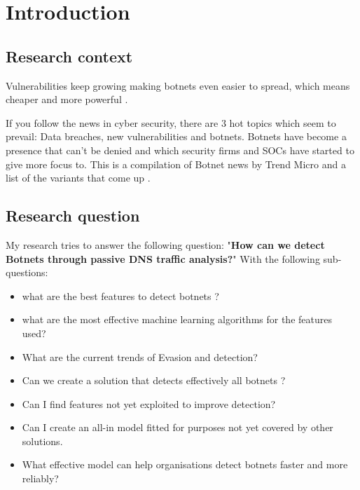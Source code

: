 
\chapter{Introduction} %

\label{Introduction} %


\newcommand{\keyword}[1]{\textbf{#1}}
\newcommand{\tabhead}[1]{\textbf{#1}}
\newcommand{\code}[1]{\texttt{#1}}
\newcommand{\file}[1]{\texttt{\bfseries#1}}
\newcommand{\option}[1]{\texttt{\itshape#1}}

\section{Research context}
Vulnerabilities keep growing making botnets even easier to spread, which means cheaper and more powerful \cite{article1}.

If you follow the news in cyber security, there are 3 hot topics which seem to prevail: Data breaches, new vulnerabilities and botnets. Botnets have become a presence that can't be denied and which security firms and SOCs have started to give more focus to. 
This is a compilation of Botnet news by Trend Micro\cite{trends3} and a list of the variants that come up  \cite{variants}.
\section{Research question}
My research tries to answer the following question: "\textbf{How can we detect Botnets through passive DNS traffic analysis?}"
With the following sub-questions:
\begin{itemize}
\item what are the best features to detect botnets ?
\item what are the most effective machine learning algorithms for the features used?
\item What are the current trends of Evasion and detection?
\item Can we create a solution that detects effectively all botnets ?
\item Can I find features not yet exploited to improve detection?
\item Can I create an all-in model fitted for purposes not yet covered by other solutions.
\item What effective model can help organisations detect botnets faster and more reliably?
\end{itemize}
